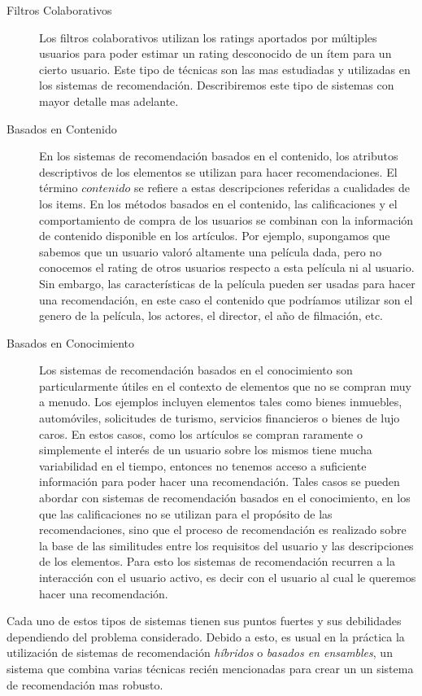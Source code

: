 \documentclass[hidelinks,12pt,a4paper]{book}
\theoremstyle{plain}
\theoremstyle{definition}
\begin{document}
\begin{description}
\item[Filtros Colaborativos] Los filtros colaborativos utilizan los ratings aportados por múltiples usuarios para poder estimar un rating desconocido de un ítem para un cierto usuario. Este tipo de técnicas son las mas estudiadas y utilizadas en los sistemas de recomendación. Describiremos este tipo de sistemas con mayor detalle mas adelante.
\item[Basados en Contenido] En los sistemas de recomendación basados en el contenido, los atributos descriptivos de los elementos se utilizan para hacer recomendaciones. El término $contenido$ se refiere a estas descripciones referidas a cualidades de los items. En los métodos basados en el contenido, las calificaciones y el comportamiento de compra de los usuarios se combinan con la información de contenido disponible en los artículos. Por ejemplo, supongamos que sabemos que un usuario valoró altamente una película dada, pero no conocemos el rating de otros usuarios respecto a esta película ni al usuario. Sin embargo, las características de la película pueden ser usadas para hacer una recomendación, en este caso el contenido que podríamos utilizar son el genero de la película, los actores, el director, el año de filmación, etc.
\item[Basados en Conocimiento] Los sistemas de recomendación basados en el conocimiento son particularmente útiles en el contexto de elementos que no se compran muy a menudo. Los ejemplos incluyen elementos tales como bienes inmuebles, automóviles, solicitudes de turismo, servicios financieros o bienes de lujo caros. En estos casos, como los artículos se compran raramente o simplemente el interés de un usuario sobre los mismos tiene mucha variabilidad en el tiempo, entonces no tenemos acceso a suficiente información para poder hacer una recomendación. Tales casos se pueden abordar con sistemas de recomendación basados en el conocimiento, en los que las calificaciones no se utilizan para el propósito de las recomendaciones, sino que el proceso de recomendación es
realizado sobre la base de las similitudes entre los requisitos del usuario y las descripciones de los elementos. Para esto los sistemas de recomendación recurren a la interacción con el usuario activo, es decir con el usuario al cual le queremos hacer una recomendación.
\end{description}

Cada uno de estos tipos de sistemas tienen sus puntos fuertes y sus debilidades dependiendo del problema considerado. Debido a esto, es usual en la práctica la utilización de sistemas de recomendación \textit{híbridos} o \textit{basados en ensambles}, un sistema que combina varias técnicas recién mencionadas para crear un un sistema de recomendación mas robusto.
\end{document}
